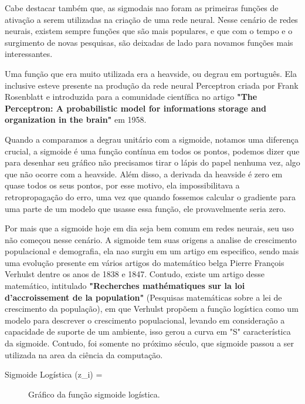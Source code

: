 Cabe destacar também que, as sigmodais nao foram as primeiras funções de ativação a serem utilizadas na criação de uma rede neural. Nesse cenário de redes neurais, existem sempre funções que são mais populares, e que com o tempo e o surgimento de novas pesquisas, são deixadas de lado para novamos funções mais interessantes.

Uma função que era muito utilizada era a heavside, ou degrau em português. Ela inclusive esteve presente na produção da rede neural Perceptron criada por Frank Rosenblatt e introduzida para a comunidade científica no artigo \textbf{"The Perceptron: A probabilistic model for informations storage and organization in the brain"} em 1958.

Quando a comparamos a degrau unitário com a sigmoide, notamos uma diferença crucial, a sigmoide é uma função contínua em todos os pontos, podemos dizer que para desenhar seu gráfico não precisamos tirar o lápis do papel nenhuma vez, algo que não ocorre com a heavside. Além disso, a derivada da heavside é zero em quase todos os seus pontos, por esse motivo, ela impossibilitava a retropropagação do erro, uma vez que quando fossemos calcular o gradiente para uma parte de um modelo que usasse essa função, ele provavelmente seria zero.

Por mais que a sigmoide hoje em dia seja bem comum em redes neurais, seu uso não começou nesse cenário. A sigmoide tem suas origens a analise de crescimento populacional e demografia, ela nao surgiu em um artigo em especifico, sendo mais uma evolução presente em vários artigos do matemático belga Pierre François Verhulst dentre os anos de 1838 e 1847. Contudo, existe um artigo desse matemático, intitulado \textbf{"Recherches mathématiques sur la loi d'accroissement de la population"} (Pesquisas matemáticas sobre a lei de crescimento da população), em que Verhulst propõem a função logística como um modelo para descrever o crescimento populacional, levando em consideração a capacidade de suporte de um ambiente, isso gerou a curva em "S" característica da sigmoide. Contudo, foi somente no próximo século, que sigmoide passou a ser utilizada na area da ciência da computação.

\begin{equacaodestaque}{Sigmoide Logística}
    \sigma(z_i) = 
    \label{eq:sigmoide}
\end{equacaodestaque}

\begin{figure}[h!]
    \centering
    \caption{Gráfico da função sigmoide logística.}
    \label{fig: GraphSigmoid}
\end{figure}

